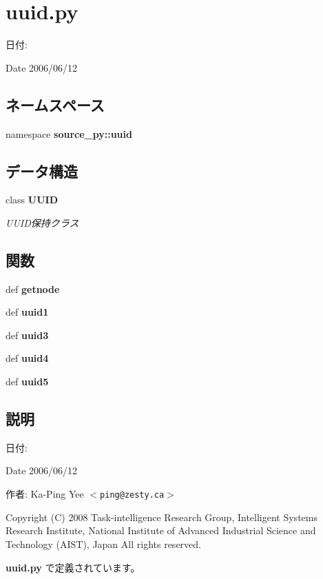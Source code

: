 \section{uuid.py}
\label{uuid_8py}
\begin{Desc}
\item[日付:]\end{Desc}
\begin{Desc}
\item[Date]2006/06/12 \end{Desc}


\subsection*{ネームスペース}
\begin{CompactItemize}
\item 
namespace \textbf{source\_\-py::uuid}
\end{CompactItemize}
\subsection*{データ構造}
\begin{CompactItemize}
\item 
class {\bf UUID}
\begin{CompactList}\small\item\em UUID保持クラス \item\end{CompactList}\end{CompactItemize}
\subsection*{関数}
\begin{CompactItemize}
\item 
def {\bf getnode}
\item 
def {\bf uuid1}
\item 
def {\bf uuid3}
\item 
def {\bf uuid4}
\item 
def {\bf uuid5}
\end{CompactItemize}


\subsection{説明}
\begin{Desc}
\item[日付:]\end{Desc}
\begin{Desc}
\item[Date]2006/06/12 \end{Desc}


\begin{Desc}
\item[作者:]Ka-Ping Yee $<${\tt ping@zesty.ca}$>$\end{Desc}
Copyright (C) 2008 Task-intelligence Research Group, Intelligent Systems Research Institute, National Institute of Advanced Industrial Science and Technology (AIST), Japan All rights reserved. 

 {\bf uuid.py} で定義されています。